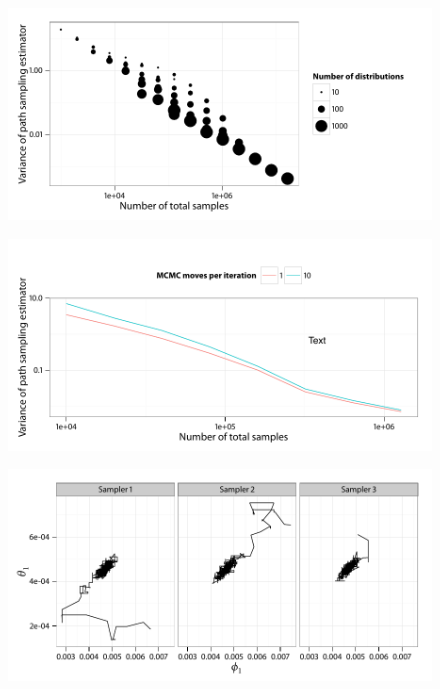 \documentclass[11pt, fontset=Minion]{mthesis}
\begin{document}
\begin{figure}
  \includegraphics[width=\linewidth]{Particle_Iter_Var}
\end{figure}

\begin{figure}
  \includegraphics[width=\linewidth]{MCMC_Iter_Var}
\end{figure}

\begin{figure}
  \includegraphics[width=\linewidth]{PET_MH_Path}
\end{figure}
\end{document}
